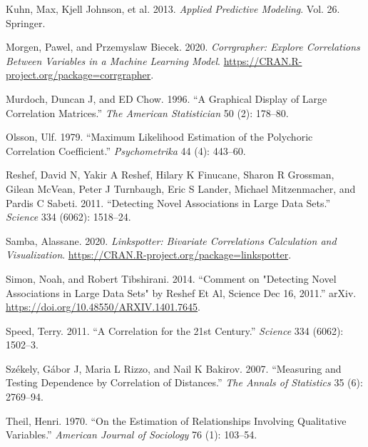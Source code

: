 \begin{CSLReferences}{1}{0}
\leavevmode{}%
Kuhn, Max, Kjell Johnson, et al. 2013. \emph{Applied Predictive Modeling}. Vol. 26. Springer.

\leavevmode{}%
Morgen, Pawel, and Przemyslaw Biecek. 2020. \emph{Corrgrapher: Explore Correlations Between Variables in a Machine Learning Model}. \url{https://CRAN.R-project.org/package=corrgrapher}.

\leavevmode{}%
Murdoch, Duncan J, and ED Chow. 1996. {``A Graphical Display of Large Correlation Matrices.''} \emph{The American Statistician} 50 (2): 178--80.

\leavevmode{}%
Olsson, Ulf. 1979. {``Maximum Likelihood Estimation of the Polychoric Correlation Coefficient.''} \emph{Psychometrika} 44 (4): 443--60.

\leavevmode{}%
Reshef, David N, Yakir A Reshef, Hilary K Finucane, Sharon R Grossman, Gilean McVean, Peter J Turnbaugh, Eric S Lander, Michael Mitzenmacher, and Pardis C Sabeti. 2011. {``Detecting Novel Associations in Large Data Sets.''} \emph{Science} 334 (6062): 1518--24.

\leavevmode{}%
Samba, Alassane. 2020. \emph{Linkspotter: Bivariate Correlations Calculation and Visualization}. \url{https://CRAN.R-project.org/package=linkspotter}.

\leavevmode{}%
Simon, Noah, and Robert Tibshirani. 2014. {``Comment on "Detecting Novel Associations in Large Data Sets" by Reshef Et Al, Science Dec 16, 2011.''} arXiv. \url{https://doi.org/10.48550/ARXIV.1401.7645}.

\leavevmode{}%
Speed, Terry. 2011. {``A Correlation for the 21st Century.''} \emph{Science} 334 (6062): 1502--3.

\leavevmode{}%
Székely, Gábor J, Maria L Rizzo, and Nail K Bakirov. 2007. {``Measuring and Testing Dependence by Correlation of Distances.''} \emph{The Annals of Statistics} 35 (6): 2769--94.

\leavevmode{}%
Theil, Henri. 1970. {``On the Estimation of Relationships Involving Qualitative Variables.''} \emph{American Journal of Sociology} 76 (1): 103--54.


\end{CSLReferences}
